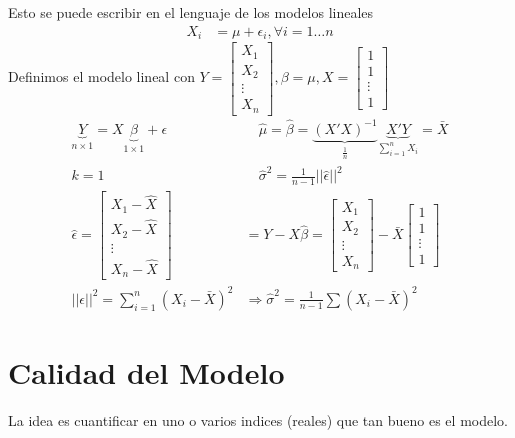 \documentclass[10pt]{article}
\theoremstyle{plain}
\theoremstyle{definition}
\begin{document}
Esto se puede escribir en el lenguaje de los modelos lineales
\begin{align*}
X_{i} &= \mu + \epsilon_{i}, \forall i = 1\ldots n
\end{align*}
Definimos el modelo lineal con $Y = \begin{bmatrix}
           X_{1} \\
           X_{2} \\
           \vdots \\
           X_{n}
         \end{bmatrix}, \beta = \mu, X = \begin{bmatrix}
           1 \\
           1 \\
           \vdots \\
           1
         \end{bmatrix}$
\begin{align*}
\underbrace{Y}_{n\times 1}=X\underbrace{\beta}_{1\times 1} +\epsilon &\quad \hat{\mu} = \hat{\beta} = \underbrace{(X'X)^{-1}}_{\frac{1}{n}}\underbrace{X'Y}_{\sum_{i=1}^{n}X_{i}} = \bar{X}\\
k = 1 &\quad \hat{\sigma}^2 = \frac{1}{n-1} ||\hat{\epsilon}||^2\\
\hat{\epsilon} = \begin{bmatrix}
           X_{1} -\hat{X}\\
           X_{2} -\hat{X}\\
           \vdots \\
           X_{n} -\hat{X}
         \end{bmatrix} &= Y - X\hat{\beta} = \begin{bmatrix}
           X_{1} \\
           X_{2} \\
           \vdots \\
           X_{n}
         \end{bmatrix} - \bar{X} \begin{bmatrix}
           1 \\
           1 \\
           \vdots \\
           1
         \end{bmatrix}\\
||\epsilon||^2 = \sum_{i=1}^{n} (X_{i}-\bar{X})^2 &\Rightarrow \hat{\sigma}^2 = \frac{1}{n-1}\sum (X_{i}-\bar{X})^2
\end{align*}

\section{Calidad del Modelo}
La idea es cuantificar en uno o varios indices (reales) que tan bueno es el modelo.\\
\end{document}
